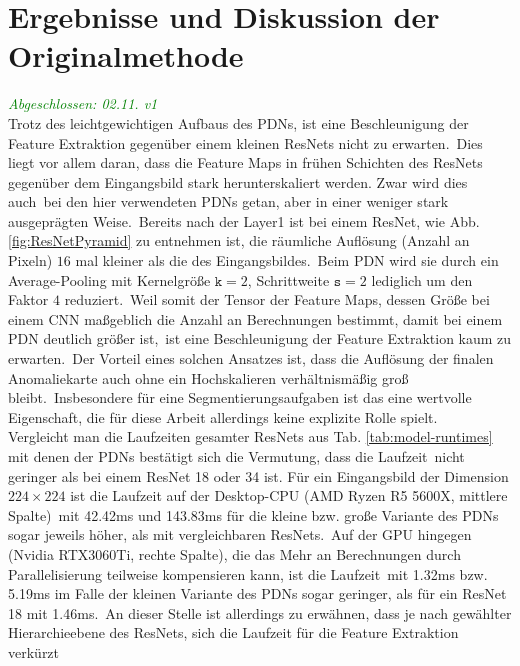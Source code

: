 \section{Ergebnisse und Diskussion der Originalmethode}\label{subsec:efficientadergebnisseunddiskussion}
\textcolor{green}{\textit{Abgeschlossen: 02.11. v1}}\\
Trotz des leichtgewichtigen Aufbaus des PDNs, ist eine Beschleunigung der Feature Extraktion gegenüber einem kleinen ResNets nicht zu erwarten.\
Dies liegt vor allem daran, dass die Feature Maps in frühen Schichten des ResNets gegenüber dem Eingangsbild stark herunterskaliert werden. Zwar wird dies auch\
bei den hier verwendeten PDNs getan, aber in einer weniger stark ausgeprägten Weise.\
Bereits nach der \glqq Layer1\grqq{} ist bei einem ResNet, wie Abb. \ref{fig:ResNetPyramid} zu entnehmen ist, die räumliche Auflösung (Anzahl an Pixeln) $16$ mal kleiner als die des Eingangsbildes.\
Beim PDN wird sie durch ein Average-Pooling mit Kernelgröße $\texttt{k}=2$, Schrittweite $\texttt{s}=2$ lediglich um den Faktor $4$ reduziert.\
Weil somit der Tensor der Feature Maps, dessen Größe bei einem CNN maßgeblich die Anzahl an Berechnungen bestimmt, damit bei einem PDN deutlich größer ist,\
ist eine Beschleunigung der Feature Extraktion kaum zu erwarten.\ 
Der Vorteil eines solchen Ansatzes ist, dass die Auflösung der finalen Anomaliekarte auch ohne ein Hochskalieren verhältnismäßig groß bleibt.\
Insbesondere für eine Segmentierungsaufgaben ist das eine wertvolle Eigenschaft, die für diese Arbeit allerdings keine explizite Rolle spielt.\\
Vergleicht man die Laufzeiten gesamter ResNets aus Tab. \ref{tab:model-runtimes} mit denen der PDNs bestätigt sich die Vermutung, dass die Laufzeit\
nicht geringer als bei einem ResNet 18 oder 34 ist. Für ein Eingangsbild der Dimension $224\times 224$ ist die Laufzeit auf der Desktop-CPU (AMD Ryzen R5 5600X, mittlere Spalte)\
mit \num{42,42}\si{\milli\second} und \num{143,83}\si{\milli\second} für die kleine bzw. große Variante des PDNs sogar jeweils höher, als mit vergleichbaren ResNets.\
Auf der GPU hingegen (Nvidia RTX3060Ti, rechte Spalte), die das Mehr an Berechnungen durch Parallelisierung teilweise kompensieren kann, ist die Laufzeit\
mit \num{1,32}\si{\milli\second} bzw. \num{5,19}\si{\milli\second} im Falle der kleinen Variante des PDNs sogar geringer, als für ein ResNet 18 mit \num{1,46}\si{\milli\second}.\
An dieser Stelle ist allerdings zu erwähnen, dass je nach gewählter Hierarchieebene des ResNets, sich die Laufzeit für die Feature Extraktion verkürzt\
